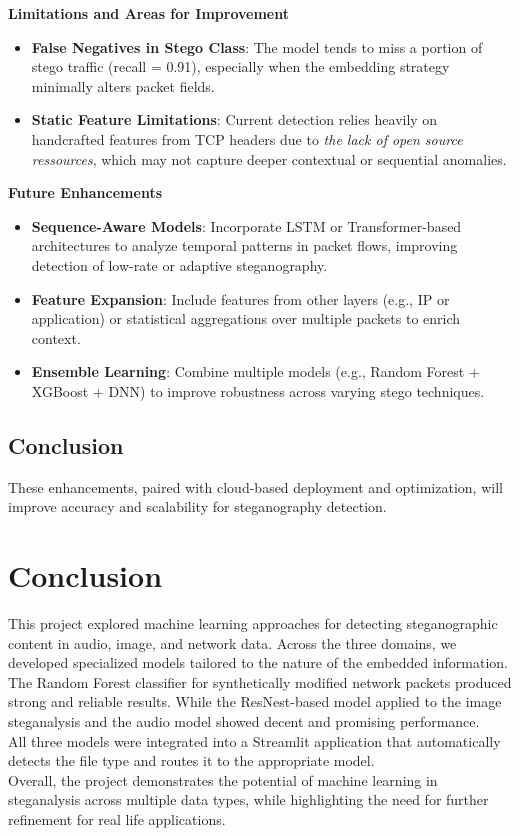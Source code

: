 \documentclass[12pt]{article}
\begin{document}
\vspace{0.3cm}
\textbf{Limitations and Areas for Improvement}
\begin{itemize}
    \item \textbf{False Negatives in Stego Class}: The model tends to miss a portion of stego traffic (recall = 0.91), especially when the embedding strategy minimally alters packet fields.
    \item \textbf{Static Feature Limitations}: Current detection relies heavily on handcrafted features from TCP headers due to \textit{the lack of open source ressources}, which may not capture deeper contextual or sequential anomalies.
\end{itemize}

\vspace{0.3cm}
\textbf{Future Enhancements}
\begin{itemize}
    \item \textbf{Sequence-Aware Models}: Incorporate LSTM or Transformer-based architectures to analyze temporal patterns in packet flows, improving detection of low-rate or adaptive steganography.
    \item \textbf{Feature Expansion}: Include features from other layers (e.g., IP or application) or statistical aggregations over multiple packets to enrich context.
    \item \textbf{Ensemble Learning}: Combine multiple models (e.g., Random Forest + XGBoost + DNN) to improve robustness across varying stego techniques.
\end{itemize}




\subsection{Conclusion}
These enhancements, paired with cloud-based deployment and optimization, will improve accuracy and scalability for steganography detection.


\newpage
\section{Conclusion}
This project explored machine learning approaches for detecting steganographic content in audio, image, and network data. Across the three domains, we developed specialized models tailored to the nature of the embedded information.\vspace{0.3cm} \\
The Random Forest classifier for synthetically modified network packets produced strong and reliable results. While the ResNest-based model applied to the image steganalysis and the audio model showed decent and promising performance. \vspace{0.3cm} \\
All three models were integrated into a Streamlit application that automatically detects the file type and routes it to the appropriate model.\vspace{0.3cm} \\
Overall, the project demonstrates the potential of machine learning in steganalysis across multiple data types, while highlighting the need for further refinement for real life applications.
\end{document}
